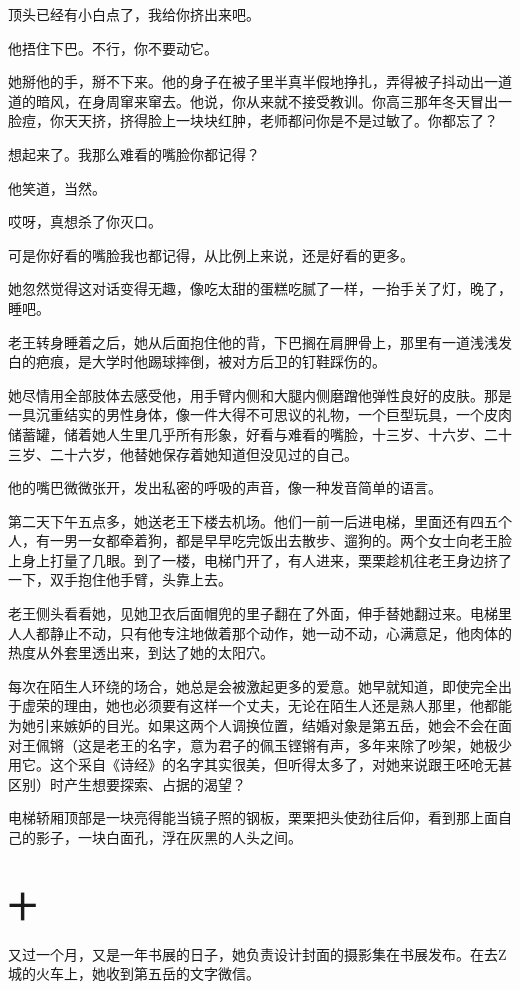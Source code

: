 \documentclass[lang=cn,newtx,12pt,scheme=chinese]{elegantbook}
\begin{document}
顶头已经有小白点了，我给你挤出来吧。

他捂住下巴。不行，你不要动它。

她掰他的手，掰不下来。他的身子在被子里半真半假地挣扎，弄得被子抖动出一道道的暗风，在身周窜来窜去。他说，你从来就不接受教训。你高三那年冬天冒出一脸痘，你天天挤，挤得脸上一块块红肿，老师都问你是不是过敏了。你都忘了？

想起来了。我那么难看的嘴脸你都记得？

他笑道，当然。

哎呀，真想杀了你灭口。

可是你好看的嘴脸我也都记得，从比例上来说，还是好看的更多。

她忽然觉得这对话变得无趣，像吃太甜的蛋糕吃腻了一样，一抬手关了灯，晚了，睡吧。

老王转身睡着之后，她从后面抱住他的背，下巴搁在肩胛骨上，那里有一道浅浅发白的疤痕，是大学时他踢球摔倒，被对方后卫的钉鞋踩伤的。

她尽情用全部肢体去感受他，用手臂内侧和大腿内侧磨蹭他弹性良好的皮肤。那是一具沉重结实的男性身体，像一件大得不可思议的礼物，一个巨型玩具，一个皮肉储蓄罐，储着她人生里几乎所有形象，好看与难看的嘴脸，十三岁、十六岁、二十三岁、二十六岁，他替她保存着她知道但没见过的自己。

他的嘴巴微微张开，发出私密的呼吸的声音，像一种发音简单的语言。

第二天下午五点多，她送老王下楼去机场。他们一前一后进电梯，里面还有四五个人，有一男一女都牵着狗，都是早早吃完饭出去散步、遛狗的。两个女士向老王脸上身上打量了几眼。到了一楼，电梯门开了，有人进来，栗栗趁机往老王身边挤了一下，双手抱住他手臂，头靠上去。

老王侧头看看她，见她卫衣后面帽兜的里子翻在了外面，伸手替她翻过来。电梯里人人都静止不动，只有他专注地做着那个动作，她一动不动，心满意足，他肉体的热度从外套里透出来，到达了她的太阳穴。

每次在陌生人环绕的场合，她总是会被激起更多的爱意。她早就知道，即使完全出于虚荣的理由，她也必须要有这样一个丈夫，无论在陌生人还是熟人那里，他都能为她引来嫉妒的目光。如果这两个人调换位置，结婚对象是第五岳，她会不会在面对王佩锵（这是老王的名字，意为君子的佩玉铿锵有声，多年来除了吵架，她极少用它。这个采自《诗经》的名字其实很美，但听得太多了，对她来说跟王呸呛无甚区别）时产生想要探索、占据的渴望？

电梯轿厢顶部是一块亮得能当镜子照的钢板，栗栗把头使劲往后仰，看到那上面自己的影子，一块白面孔，浮在灰黑的人头之间。
\section{十}
又过一个月，又是一年书展的日子，她负责设计封面的摄影集在书展发布。在去Z城的火车上，她收到第五岳的文字微信。
\end{document}
